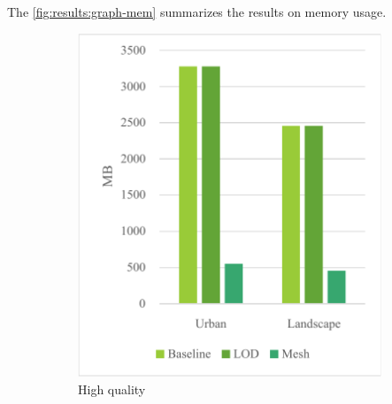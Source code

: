 The \autoref{fig:results:graph-mem} summarizes the results on memory usage.

\begin{figure}[h]
    \centering
    
    \begin{subfigure}{0.3\textwidth}
        \centering
        \includegraphics[width=\textwidth]{graph-mem-high.pdf}
        \caption{High quality}
    \end{subfigure}
    \begin{subfigure}{0.3\textwidth}
        \centering

\end{subfigure}
\end{figure}
